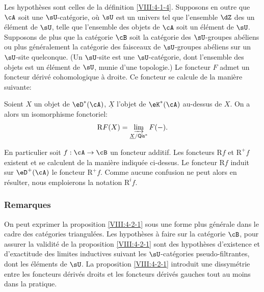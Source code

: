 \begin{proposition}\label{VIII:4-2-1}
Les hypothèses sont celles de la définition \ref{VIII:4-1-4}. Supposons 
en outre que $\cA$ soit une $\sU$-catégorie, où $\sU$ est un univers tel 
que l'ensemble $\dZ$ des  un élément de $\sU$, telle 
que l'ensemble des objets de $\cA$ soit un élément de $\sU$. Supposons 
de plus que la catégorie $\cB$ soit la catégorie des $\sU$-groupes 
abéliens ou plus généralement la catégorie des faisceaux de 
$\sU$-groupes abéliens sur un $\sU$-site quelconque. (Un $\sU$-site est une 
$\sU$-catégorie, dont l'ensemble des objets est un élément de $\sU$, 
munie d'une topologie.) Le foncteur $F$ admet un foncteur dérivé 
cohomologique à droite. Ce foncteur se calcule de la manière suivante: 

Soient $X$ un objet de $\eD^\ast(\cA)$, $\underline X$ l'objet de 
$\eK^\ast(\cA)$ au-dessus de $X$. On a alors un isomorphisme fonctoriel: 
\[
  \mathrm{R} F(X) = \varinjlim_{\underline X/\mathsf{Qis}^\ast} F(-) \text{.}
\]
\end{proposition}

En particulier soit $f:\cA\to \cB$ un foncteur additif. Les foncteurs 
$\mathrm{R} f$ et $\mathrm{R}^+ f$ existent et se calculent de la manière indiquée 
ci-dessus. Le foncteur $\mathrm{R} f$ induit sur $\eD^+(\cA)$ le foncteur 
$\mathrm{R}^+ f$. Comme aucune confusion ne peut alors en résulter, nous 
emploierons la notation $\mathrm{R}^i f$. 





\subsubsection{Remarques}\label{VIII:4-2-2}

On peut exprimer la proposition \ref{VIII:4-2-1} sous une forme plus 
générale dans le cadre des catégories triangulées. Les hypothèses 
à faire sur la catégorie $\cB$, pour assurer la validité de la 
proposition \ref{VIII:4-2-1} sont des hypothèses d'existence et d'exactitude 
des limites inductives suivant les $\sU$-catégories pseudo-filtrantes, dont 
les  éléments de $\sU$. La proposition 
\ref{VIII:4-2-1} introduit une dissymétrie entre les foncteurs dérivés 
droits et les foncteurs dérivés gauches tout au moins dans la pratique. 





